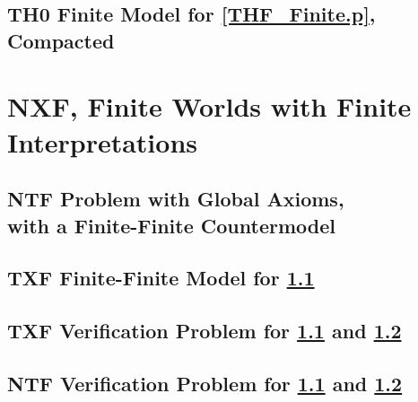 \documentclass{easychair}
\begin{document}
\newpage
\subsection{TH0 Finite Model for \ref{THF_Finite.p}, Compacted}
\label{THF_Finite_Compact.s}
\begin{small}

\end{small}

\newpage
\section{NXF, Finite Worlds with Finite Interpretations}
\label{NXF}

\subsection{NTF Problem with Global Axioms, \\ with a Finite-Finite Countermodel}
\label{NTF_Finite-Finite-Global.p}
\begin{small}

\end{small}

\newpage
\subsection{TXF Finite-Finite Model for \ref{NTF_Finite-Finite-Global.p}}
\label{NTF_Finite-Finite-Global.s}
\begin{small}

\end{small}

\newpage
\subsection{TXF Verification Problem for \ref{NTF_Finite-Finite-Global.p} and 
\ref{NTF_Finite-Finite-Global.s}}
\label{NTF_Finite-Finite-Global.s.p}
\begin{small}

\end{small}

\newpage
\subsection{NTF Verification Problem for \ref{NTF_Finite-Finite-Global.p} and 
\ref{NTF_Finite-Finite-Global.s}}
\label{NTF_Finite-Finite-Global.s.NTF.p}
\begin{small}

\end{small}
\end{document}
